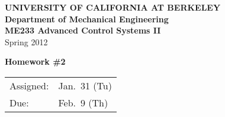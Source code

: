 \documentclass[letterpaper,12pt]{article}
\begin{document}
\begin{center}
    {\bf UNIVERSITY OF CALIFORNIA AT BERKELEY}\\
    {\bf Department of Mechanical Engineering}\\
    {\bf ME233  Advanced Control Systems II}\\
    Spring 2012\\
\end{center}
\noindent
{\Large \bf Homework \#2 }\\[-3em]
\begin{flushright}
\begin{tabular} {l l}
    Assigned: &  Jan.\ 31 (Tu) \\
    Due: & Feb.\ 9 (Th)
\end{tabular}
\end{flushright}

\begin{enumerate}







\end{enumerate}
\end{document}
